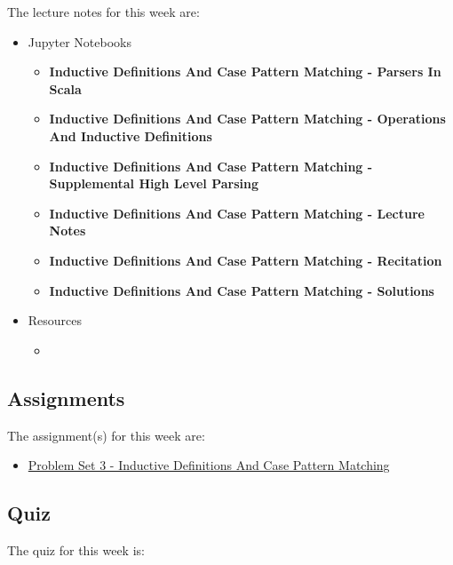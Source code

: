\noindent The lecture notes for this week are:

\begin{itemize}
    \item Jupyter Notebooks
    \begin{itemize}
        \item \textbf{Inductive Definitions And Case Pattern Matching - Parsers In Scala}
        \item \textbf{Inductive Definitions And Case Pattern Matching - Operations And Inductive Definitions}
        \item \textbf{Inductive Definitions And Case Pattern Matching - Supplemental High Level Parsing}
        \item \textbf{Inductive Definitions And Case Pattern Matching - Lecture Notes}
        \item \textbf{Inductive Definitions And Case Pattern Matching - Recitation}
        \item \textbf{Inductive Definitions And Case Pattern Matching - Solutions}
    \end{itemize}
    \item Resources
    \begin{itemize}
        \item {}
    \end{itemize}
\end{itemize}

\subsection{Assignments}

The assignment(s) for this week are:

\begin{itemize}
    \item \href{https://github.com/QuantumCompiler/CU/tree/main/CSPB%203155%20-%20Principles%20Of%20Programming%20Languages/Assignments/Problem%20Sets/Problem%20Set%203%20-%20Inductive%20Definitions%20And%20Case%20Pattern%20Matching}{Problem Set 3 - Inductive Definitions And Case Pattern Matching}
\end{itemize}

\subsection{Quiz}

The quiz for this week is:

